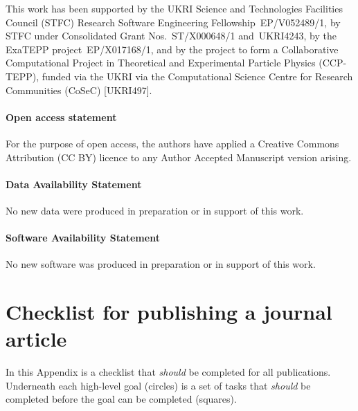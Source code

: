 \documentclass{article}
\newcommand\rfcword[1]{\emph{#1}\xspace}
\newcommand\should{\rfcword{should}}
\begin{document}
This work has been supported by the
UKRI Science and Technologies Facilities Council (STFC)
Research Software Engineering Fellowship~EP/V052489/1,
by STFC under Consolidated Grant Nos.~ST/X000648/1 and~UKRI4243,
by the ExaTEPP project~EP/X017168/1,
and by
the project to form a Collaborative Computational Project
in Theoretical and Experimental Particle Physics
(CCP-TEPP),
funded via the UKRI
via the Computational Science Centre for Research Communities (CoSeC) [UKRI497].

\paragraph*{Open access statement}
For the purpose of open access,
the authors have
applied a Creative Commons Attribution (CC BY) licence
to any Author Accepted Manuscript version arising.

\paragraph*{Data Availability Statement}
No new data were produced in preparation or in support of this work.

\paragraph*{Software Availability Statement}
No new software was produced in preparation or in support of this work.



\nocite{apsrev41Control}


\clearpage
\appendix

\section{Checklist for publishing a journal article}\label{app:checklist}

In this Appendix is a checklist that \should be completed for all publications.
Underneath each high-level goal
(circles)
is a set of tasks that \should be completed before the goal can be completed
(squares).

\begin{Form}
\noindent
{}

\noindent
{}
\end{Form}
\end{document}
